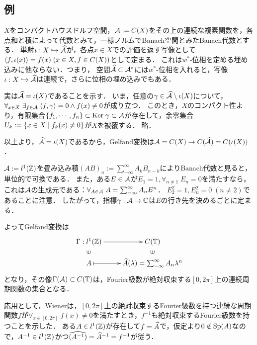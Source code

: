 \documentclass[uplatex,dvipdfmx]{jsreport}
\begin{document}
\subsection{例}

\begin{example}[$C(X)$のGelfand変換は恒等写像である]
    $X$をコンパクトハウスドルフ空間，$\mathcal{A}:=C(X)$をその上の連続な複素関数を，各点和と積によって代数とみて，一様ノルムでBanach空間とみたBanach代数とする．
    単射$\iota:X\hookrightarrow\widehat{\mathcal{A}}$が，各点$x\in X$での評価を返す写像として$\langle f,\iota(x)\rangle=f(x)\;(x\in X,f\in C(X))$として定まる．
    これは$w^*$-位相を定める埋め込みに他ならない．つまり，
    空間$\widehat{\mathcal{A}}\subset \mathcal{A}^*$には$w^*$-位相を入れると，写像$\iota:X\hookrightarrow\widehat{\mathcal{A}}$は連続で，さらに位相の埋め込みでもある．
    
    実は$\widehat{\mathcal{A}}=\iota(X)$であることを示す．
    いま，任意の$\gamma\in\widehat{\mathcal{A}}\setminus\iota(X)$について，$\forall_{x\in X}\;\exists_{f\in\mathcal{A}}\;\langle f,\gamma\rangle=0\land f(x)\ne0$が成り立つ．
    このとき，$X$のコンパクト性より，有限集合$\{f_1,\cdots,f_n\}\subset\mathrm{Ker}\;\gamma\subset\mathcal{A}$が存在して，余零集合$U_k:=\left\{x\in X\mid f_k(x)\ne0\right\}$が$X$を被覆する．
    略．

    以上より，$\widehat{\mathcal{A}}=\iota(X)$であるから，Gelfand変換は$\mathcal{A}=C(X)\to C(\widehat{\mathcal{A}})=C(\iota(X))$．
\end{example}

\begin{example}[絶対収束数列と連続な周期関数の間のGelfand変換]
    $\mathcal{A}:=l^1(\mathbb{Z})$を畳み込み積$(AB)_n:=\sum^\infty_{-\infty}A_kB_{n-k}$によりBanach代数と見ると，単位的で可換である．
    また，ある$E\in\mathcal{A}$が$E_1=1,\forall_{n\ne1}\;E_n=0$を満たすなら，これは$\mathcal{A}$の生成元である：$\forall_{A\in\mathcal{A}}\;A=\sum^\infty_{-\infty}A_nE^n$．
    $E^2_2=1,E^2_n=0\;(n\ne2)$であることに注意．
    したがって，指標$\gamma:\mathcal{A}\to\mathbb{C}$は$E$の行き先を決めるごとに定まる．

    よってGelfand変換は
    \[\xymatrix@R-2pc{
        \Gamma:l^1(\Z)\ar[r]&C(\T)\\
        \rotatebox[origin=c]{90}{$\in$}&\rotatebox[origin=c]{90}{$\in$}\\
        A\ar@{|->}[r]&\wh{A}(\lambda)=\sum^\infty_{-\infty}A_n\lambda^n
    }\]
    となり，その像$\Gamma(\mathcal{A})\subset C(\mathbb{T})$は，Fourier級数が絶対収束する$[0,2\pi]$上の連続周期関数の集合となる．

    応用として，Wienerは，$[0,2\pi]$上の絶対収束するFourier級数を持つ連続な周期関数$f$が$\forall_{x\in[0,2\pi]}\;f(x)\ne0$を満たすとき，$f^{-1}$も絶対収束するFourier級数を持つことを示した．
    ある$A\in l^1(\mathbb{Z})$が存在して$f=\widehat{A}$で，仮定より$0\notin\mathrm{Sp}(A)$なので，$A^{-1}\in l^1(\mathbb{Z})$かつ$\widehat{(A^{-1})}=\widehat{A}^{-1}=f^{-1}$が従う．
\end{example}
\end{document}
